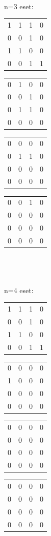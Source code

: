 \documentclass[paper=a4, fontsize=11pt]{article}
\begin{document}
\\
\\
\\
n=3 eset:
\begin{tabular}{cccc}
1&1&1&0\\
0&0&1&0\\
1&1&0&0\\
0&0&1&1
\end{tabular}
\quad
\begin{tabular}{cccc}
0&1&0&0\\
0&0&1&0\\
0&1&1&0\\
0&0&0&0
\end{tabular}
\quad
\begin{tabular}{cccc}
0&0&0&0\\
0&1&1&0\\
0&0&0&0\\
0&0&0&0
\end{tabular}
\quad
\begin{tabular}{cccc}
0&0&1&0\\
0&0&0&0\\
0&0&0&0\\
0&0&0&0
\end{tabular}
\\
\\
\\
n=4 eset:
\begin{tabular}{cccc}
1&1&1&0\\
0&0&1&0\\
1&1&0&0\\
0&0&1&1
\end{tabular}
\quad
\begin{tabular}{cccc}
0&0&0&0\\
1&0&0&0\\
0&0&0&0\\
0&0&0&0
\end{tabular}
\quad
\begin{tabular}{cccc}
0&0&0&0\\
0&0&0&0\\
0&0&0&0\\
0&0&0&0
\end{tabular}
\quad
\begin{tabular}{cccc}
0&0&0&0\\
0&0&0&0\\
0&0&0&0\\
0&0&0&0
\end{tabular}
\\
\\
\\
\end{document}
